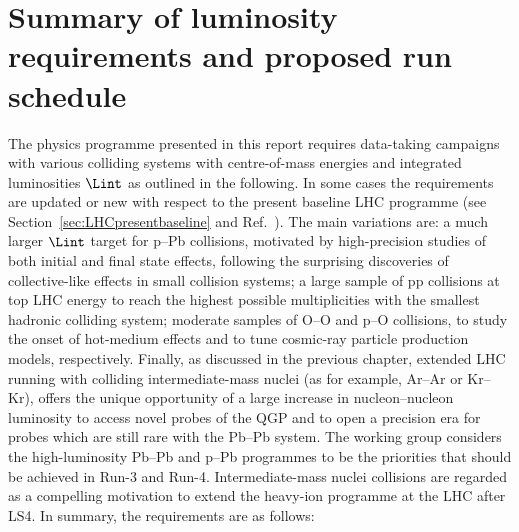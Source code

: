 \documentclass[../report.tex]{subfiles}
\begin{document}
\section{Summary of luminosity requirements and proposed run schedule}
\label{sec:schedule}

The physics programme presented in this report requires data-taking campaigns with various colliding systems with centre-of-mass energies and integrated luminosities $\Lint$ as outlined in the following. In some cases the requirements are updated or new with respect to the present baseline LHC programme (see Section~\ref{sec:LHCpresentbaseline} and Ref.~\cite{Abelevetal:2014cna}). The main variations are: a much larger $\Lint$ target for p--Pb collisions, motivated by high-precision studies of both initial and final state effects, following the surprising discoveries of collective-like effects in small collision systems; a large sample of pp collisions at top LHC energy to reach the highest possible multiplicities with the smallest hadronic colliding system; moderate samples of O--O and p--O collisions, to study the onset of hot-medium effects and to tune cosmic-ray particle production models, respectively. Finally, as discussed in the previous chapter, extended LHC running with colliding intermediate-mass nuclei (as for example, Ar--Ar or Kr--Kr), offers the unique opportunity of a large increase in nucleon--nucleon luminosity to access novel probes of the QGP and to open a precision era for probes which are still rare with the Pb--Pb system. The working group considers the high-luminosity Pb--Pb and p--Pb programmes to be the priorities that should be achieved in Run-3 and Run-4. Intermediate-mass nuclei collisions are regarded as a compelling motivation to extend the heavy-ion programme at the LHC after LS4. In summary, the requirements are as follows:
\end{document}
